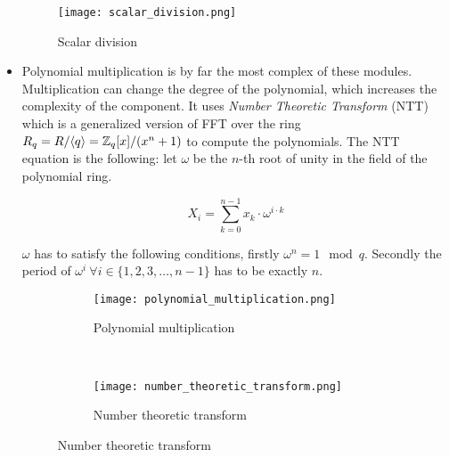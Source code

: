 \begin{itemize}
        \begin{figure}[H]
            \centering
            \texttt{[image: scalar\_division.png]}
            \caption{Scalar division \citep{FPGA_Post_Quantum_Primitives}}
            \label{fig:scalar_div}
        \end{figure}


    \item
        Polynomial multiplication is by far the most complex of these modules.
        Multiplication can change the degree of the polynomial, which increases
        the complexity of the component. It uses \textit{Number Theoretic
        Transform} (NTT) which is a generalized version of FFT over the ring
        $R_q = R / \langle q \rangle = \mathbb{Z}_q [x] / (x^n + 1)$ to compute the
        polynomials. The NTT equation is the following: let $\omega$ be the
        $n$-th root of unity in the field of the polynomial ring.

        \[ X_i = \sum^{n-1}_{k=0} x_k \cdot \omega^{i\cdot k} \]

        $\omega$ has to satisfy the following conditions, firstly
        $\omega^n = 1 \mod q$. Secondly the period of
        $\omega^i \ \forall i \in \{1, 2, 3, \ldots, n - 1\}$ has to be exactly
        $n$.

        \begin{figure}[H]
            \centering
            \begin{subfigure}[b]{0.4\textwidth}
                \centering
                \texttt{[image: polynomial\_multiplication.png]}
                \caption{Polynomial multiplication \citep{FPGA_Post_Quantum_Primitives}}
                \label{fig:poly_mul}
            \end{subfigure}
            ~
            \begin{subfigure}[b]{0.4\textwidth}
                \centering
                \texttt{[image: number\_theoretic\_transform.png]}
                \caption{Number theoretic transform
                \citep{FPGA_Post_Quantum_Primitives}}
                \label{fig:ntt}
            \end{subfigure}
        \end{figure}

\end{itemize}



